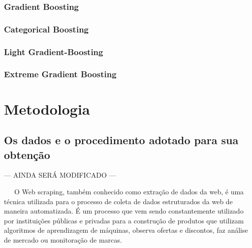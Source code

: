 \documentclass[
  12pt,
  letterpaper,
  DIV=11,
  numbers=noendperiod]{scrreprt}
\begin{document}
\subsection{Gradient Boosting}\label{gradient-boosting}

\subsection{Categorical Boosting}\label{categorical-boosting}

\subsection{Light Gradient-Boosting}\label{light-gradient-boosting}

\subsection{Extreme Gradient Boosting}\label{extreme-gradient-boosting}

\vspace{12pt}

\chapter{Metodologia}\label{metodologia}

\section{Os dados e o procedimento adotado para sua
obtenção}\label{os-dados-e-o-procedimento-adotado-para-sua-obtenuxe7uxe3o}

--- AINDA SERÁ MODIFICADO ---

~~~O Web scraping, também conhecido como extração de dados da web, é uma
técnica utilizada para o processo de coleta de dados estruturados da web
de maneira automatizada. É um processo que vem sendo constantemente
utilizado por instituições públicas e privadas para a construção de
produtos que utilizam algoritmos de aprendizagem de máquinas, observa
ofertas e discontos, faz análise de mercado ou monitoração de marcas.

\vspace{12pt}
\end{document}
